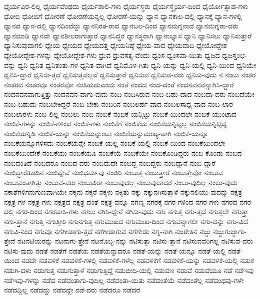 {ಧೈರ್ಯವಿರ-ಲಿಲ್ಲ
ಧೈರ್ಯವೆಂಥದು
ಧೈರ್ಯಶಾಲಿ-ಗಳು
ಧೈರ್ಯಸ್ಥರು
ಧೈರ್ಯಸ್ಥೈರ್ಯ-ದಿಂದ
ಧೈರ್ಯೋತ್ಸಾಹ-ಗಳು
ಧೋಬಿ
ಧೋಬಿಗೆ
ಧೋರಣೆ
ಧೋರಣೆಯನ್ನಲ್ಲ
ಧೋರಣೆ-ಯನ್ನು
ಧ್ಯಾನ
ಧ್ಯಾನಕಾಲ-ದಲ್ಲಿ
ಧ್ಯಾನಕ್ಕೆ
ಧ್ಯಾನ-ಗಳಲ್ಲಿ
ಧ್ಯಾನದ
ಧ್ಯಾನ-ದಲ್ಲಿ
ಧ್ಯಾನದಿಂದೆದ್ದು
ಧ್ಯಾನನಿರತ-ರಾದ
ಧ್ಯಾನಬಲ-ದಿಂದ
ಧ್ಯಾನಮಗ್ನನಾದೆ
ಧ್ಯಾನಮಗ್ನರಾ-ದರು
ಧ್ಯಾನಮಾಡಿ
ಧ್ಯಾನವೇ
ಧ್ಯಾನಶೀಲರಾಗುತ್ತಾರೆ
ಧ್ಯಾನಸಿದ್ಧರ
ಧ್ಯಾನಸ್ಥರಾಗಿ
ಧ್ಯಾನಾಭ್ಯಾಸ
ಧ್ಯಾನಿ
ಧ್ಯಾನಿಸಲು
ಧ್ಯಾನಿಸುತ್ತಾರೆ
ಧ್ಯಾನಿಸುವುದಾಗಲಿ
ಧ್ಯೇಯ
ಧ್ಯೇಯದ
ಧ್ಯೇಯದತ್ತ
ಧ್ಯೇಯನಿಷ್ಠೆ
ಧ್ಯೇಯ-ವಾದ
ಧ್ಯೇಯವಾದಿ
ಧ್ಯೇಯೋದ್ದೇಶ
ಧ್ಯೇಯೋದ್ದೇಶ-ಗಳನ್ನು
ಧ್ಯೇಯೋದ್ದೇಶ-ಗಳು
ಧ್ರುವ
ಧ್ರುವಸತ್ಯ-ವೆಂದು
ಧ್ವಂಸ
ಧ್ವಂಸವಾ-ಯಿತು
ಧ್ವಜದ
ಧ್ವಜಸ್ತಂಭ-ವನ್ನು
ಧ್ವನಿ
ಧ್ವನಿತ
ಧ್ವನಿತಂತು-ಗಳ
ಧ್ವನಿತ-ವಾಗಿದೆ
ಧ್ವನಿಮೊಳ-ಗಿತು
ಧ್ವನಿ-ಯನ್ನು
ಧ್ವನಿ-ಯಲ್ಲಿ
ಧ್ವನಿ-ಯಿಂದ
ಧ್ವನಿಯೇ
ಧ್ವನಿಸಿ-ದ್ದಾರೆ
ಧ್ವನಿಸು-ತ್ತದೆ
ಧ್ವನಿಸುತ್ತವಲ್ಲವೆ
ಧ್ವನಿಸುತ್ತಾರೆ
ಧ್ವನಿಸುವ
ಧ್ವನಿಸುವ-ವರು
ಧ್ವನಿಸು-ವುದು
ನ
ನಂಟು
ನಂತರ
ನಂತರದ
ನಂತರವೂ
ನಂತರವೋ
ನಂತಿಹುದುಎಂದು
ನಂತೆ
ನಂದದ
ನಂದ-ದಂತೆ
ನಂದನವನವನ್ನಾಗಿಸಿ-ದ್ದಾರೆ
ನಂದನವನವಾಗುತ್ತಿತ್ತು
ನಂದನವನ-ವಾಗು-ವುದು
ನಂದಿ
ನಂದಿಸಿರುವ
ನಂಬ-ಬಹು-ದಾದ
ನಂಬದಾ-ದರು
ನಂಬದೆಯೇ
ನಂಬ-ಬಹುದು
ನಂಬಬೇಕಿದ್ದರೆ
ನಂಬ-ಬೇಕು
ನಂಬರಿನ
ನಂಬಲರ್ಹ-ವಾದ
ನಂಬಲಸಾಧ್ಯ-ವಾದ
ನಂಬ-ಲಾರ
ನಂಬಲಾರಳು
ನಂಬ-ಲಿಲ್ಲ
ನಂಬಲು
ನಂಬಿ
ನಂಬಿಕೆ
ನಂಬಿಕೆ-ಯನ್ನಿಟ್ಟು
ನಂಬಿಕೆ-ಯಿಂದಲೇ
ನಂಬಿಕೆ-ಯುಂಟಾದ
ನಂಬಿಕೆ-ಗಳನ್ನು
ನಂಬಿಕೆ-ಗಳಿಂದ
ನಂಬಿಕೆ-ಗಳು
ನಂಬಿಕೆಗೆ
ನಂಬಿಕೆಯ
ನಂಬಿಕೆಯನ್ನಿಟ್ಟಲ್ಲ
ನಂಬಿಕೆಯನ್ನಿಟ್ಟಿದ್ದ
ನಂಬಿಕೆಯನ್ನಿಡಿ
ನಂಬಿಕೆ-ಯನ್ನು
ನಂಬಿಕೆಯನ್ನುಂಟು
ನಂಬಿಕೆಯನ್ನುಮುಖ್ಯ-ವಾಗಿ
ನಂಬಿಕೆ-ಯನ್ನೂ
ನಂಬಿಕೆಯನ್ನೂಗಳಿಸದು
ನಂಬಿಕೆಯನ್ನೇ
ನಂಬಿಕೆ-ಯಲ್ಲ
ನಂಬಿಕೆ-ಯಲ್ಲಿ
ನಂಬಿಕೆ-ಯಿಂದ
ನಂಬಿಕೆಯಿಂದಲೇ
ನಂಬಿಕೆಯಿಂದೇಕೆ
ನಂಬಿಕೆಯು
ನಂಬಿಕೆಯೂ
ನಂಬಿಕೆಯೆ
ನಂಬಿಕೆಯೇ
ನಂಬಿಕೊಂಡಿದ್ದರು
ನಂಬಿ-ಕೊಂಡು
ನಂಬಿದ
ನಂಬಿದಂತಿದೆ
ನಂಬಿದರೂ
ನಂಬಿದ-ವರು
ನಂಬಿದುದೇ
ನಂಬಿದ್ದ
ನಂಬಿದ್ದರು
ನಂಬಿದ್ದಾನೆ
ನಂಬಿ-ದ್ದಾರೆ
ನಂಬಿದ್ದಾರೆಹಿಂದಿನ
ನಂಬಿದ್ದೇವೆ
ನಂಬಿಧರ್ಮವು
ನಂಬಿರಿ
ನಂಬುತ್ತ
ನಂಬುತ್ತಾರೆ
ನಂಬುತ್ತೇವೋ
ನಂಬುವ
ನಂಬುವಂತಾಗಿತ್ತು
ನಂಬುವ-ವರು
ನಂಬುವಿರಾ
ನಂಬುವುದಲ್ಲ
ನಂಬುವುದಾದರೆ
ನಂಬು-ವುದಿಲ್ಲ
ನಂಬು-ವುದು
ನಕಾಶೆಗಳಿಗನುಗುಣವಾಗಿಯೇ
ನಕ್ಕನು
ನಕ್ಕರೆ
ನಕ್ಕಳು
ನಕ್ಕಿತು
ನಕ್ಕು
ನಕ್ಕುನಗಿಸುತ್ತಾಳೆ
ನಕ್ಕುನಲಿಯು-ವುದನ್ನು
ನಕ್ಷತ್ರ
ನಕ್ಷತ್ರ-ಗಳ
ನಕ್ಷತ್ರ-ಗಳು
ನಕ್ಷತ್ರದ
ನಕ್ಷತ್ರ-ದಂತೆ
ನಕ್ಷತ್ರ-ವನ್ನೂ
ನಗಣ್ಯ
ನಗರಕ್ಕೆ
ನಗರ-ಗಳಿಂದ
ನಗರ-ಗಳು
ನಗರದ
ನಗರ-ದಲ್ಲಿ
ನಗರ-ದಿಂದ
ನಗರವಾಸಿ-ಗಳು
ನಗಲು
ನಗಿಸಿ-ದ್ದೇನೆ
ನಗಿಸು-ವುದು
ನಗು
ನಗುತ್ತ
ನಗು-ತ್ತದೆ
ನಗುತ್ತಲೇ
ನಗುತ್ತಾ
ನಗು-ತ್ತಾನೆ
ನಗುತ್ತಿ
ನಗುತ್ತೀರಿ
ನಗುನಗುತ್ತ
ನಗುಮುಖದ
ನಗುಮುಖ-ದಿಂದ
ನಗುವನ್ನಾಗಲೀ
ನಗು-ವನ್ನು
ನಗು-ವಿದೆ
ನಗುವಿ-ನಿಂದ
ನಗುವೂ
ನಗೆಗೀಡಾಗು-ತ್ತದೆ
ನಗೆಗೀಡಾಗುವ
ನಗೆಗೇಡು
ನಗ್ನ-ನಾಗಿ
ನಜರೇತಿನ
ನಜ್ಜು
ನಜ್ಜುಗುಜ್ಜಾಗು-ತ್ತೇವೆ
ನಟನಟಿಯರನ್ನು
ನಟನಾಗು-ತ್ತೇನೆ
ನಟನೊಬ್ಬ-ನನ್ನು
ನಟಿಸುತ್ತಾ
ನಟಿಸು-ತ್ತಾನೆ
ನಟಿಸುವವರಿಗಲ್ಲ
ನಟಿಸುವ-ವರು
ನಟಿಸು-ವುದು
ನಡತೆ
ನಡತೆಗೆ
ನಡತೆಯ
ನಡತೆಯನ್ನಾದರೂ
ನಡತೆ-ಯನ್ನು
ನಡತೆ-ಯನ್ನೂ
ನಡತೆ-ಯಲ್ಲಿ
ನಡತೆ-ಯಿಂದ
ನಡದೇ
ನಡವಳಿಕೆ
ನಡವಳಿಕೆ-ಗಳಲ್ಲಿ
ನಡವಳಿಕೆ-ಗಳೆಲ್ಲ
ನಡವಳಿಕೆಗೆ
ನಡವಳಿಕೆ-ಯನ್ನು
ನಡವಳಿಕೆ-ಯಲ್ಲಿ
ನಡುಕ
ನಡುಗಿ-ದಳು
ನಡುಗುತ್ತ
ನಡುಗುತ್ತಾಳೆ
ನಡುಗುತ್ತಿದ್ದೆ
ನಡುಬೀದಿ-ಯಲ್ಲಿ
ನಡುವಣ
ನಡುವೆ
ನಡುವೆಯೂ
ನಡೆ
ನಡೆಇವು
ನಡೆಇವು-ಗಳನ್ನು
ನಡೆದ
ನಡೆದಂತಾಗು-ವುದಿಲ್ಲ
ನಡೆದಂತಾ-ಯಿತು
ನಡೆದಂತೆಯೆ
ನಡೆದಂತೆಲ್ಲ
ನಡೆದಂಥವು-ಗಳೇ
ನಡೆದದ್ದಿಲ್ಲ
ನಡೆದದ್ದು
ನಡೆದದ್ದೇ
ನಡೆ-ದರು
ನಡೆದರೂ
ನಡೆದರೆ
}
